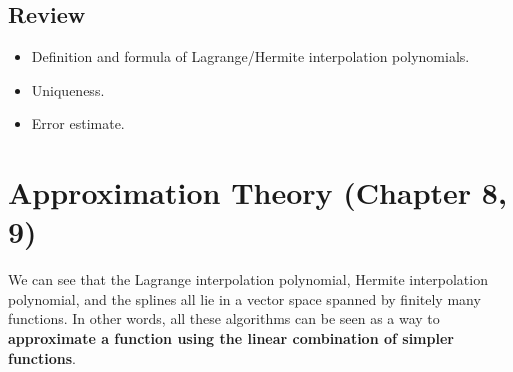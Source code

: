 \documentclass{article} %
\theoremstyle{break}
\begin{document}









\subsection{Review}

\begin{itemize}
\item Definition and formula of Lagrange/Hermite interpolation polynomials.
\item Uniqueness.
\item Error estimate.
\end{itemize}

\section{Approximation Theory (Chapter 8, 9)}

We can see that the Lagrange interpolation polynomial, Hermite interpolation polynomial, and the splines all lie in a vector space spanned by finitely many functions. In other words, all these algorithms can be seen as a way to {\bf approximate a function using the linear combination of simpler functions}.\\
\end{document}

